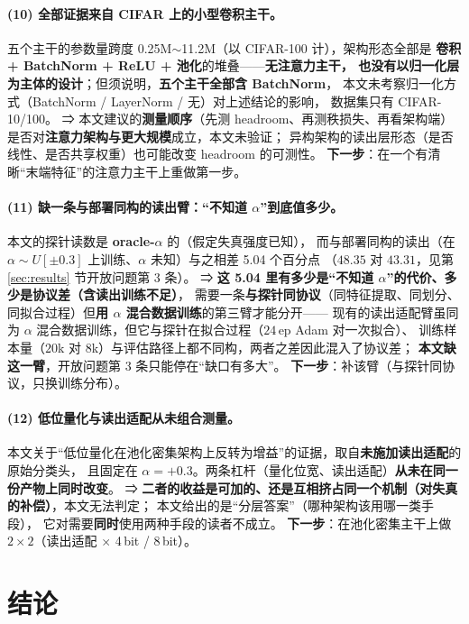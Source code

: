 \documentclass[11pt,a4paper]{ctexart}
\begin{document}
\paragraph{(10) 全部证据来自 CIFAR 上的小型卷积主干。}
五个主干的参数量跨度 0.25M$\sim$11.2M（以 CIFAR-100 计），架构形态全部是
\textbf{卷积 + BatchNorm + ReLU + 池化}的堆叠——\textbf{无注意力主干，
也没有以归一化层为主体的设计}；但须说明，\textbf{五个主干全部含 BatchNorm}，
本文未考察归一化方式（BatchNorm / LayerNorm / 无）对上述结论的影响，
数据集只有 CIFAR-10/100。
⇒ 本文建议的\textbf{测量顺序}（先测 headroom、再测秩损失、再看架构端）
是否对\textbf{注意力架构与更大规模}成立，本文未验证；
异构架构的读出层形态（是否线性、是否共享权重）也可能改变 headroom 的可测性。
\textbf{下一步}：在一个有清晰“末端特征”的注意力主干上重做第一步。

\paragraph{(11) 缺一条与部署同构的读出臂：“不知道 $\alpha$”到底值多少。}
本文的探针读数是 \textbf{oracle-$\alpha$} 的（假定失真强度已知），
而与部署同构的读出（在 $\alpha\sim U[\pm0.3]$ 上训练、$\alpha$ 未知）与之相差 5.04 个百分点
（$48.35$ 对 $43.31$，见第 \ref{sec:results} 节开放问题第 3 条）。
⇒ \textbf{这 5.04 里有多少是“不知道 $\alpha$”的代价、多少是协议差（含读出训练不足）}，
需要一条\textbf{与探针同协议}（同特征提取、同划分、同拟合过程）但\textbf{用 $\alpha$ 混合数据训练}的第三臂才能分开——
现有的读出适配臂虽同为 $\alpha$ 混合数据训练，但它与探针在拟合过程（$24$\,ep Adam 对一次拟合）、
训练样本量（$20$k 对 $8$k）与评估路径上都不同构，两者之差因此混入了协议差；
\textbf{本文缺这一臂}，开放问题第 3 条只能停在“缺口有多大”。
\textbf{下一步}：补该臂（与探针同协议，只换训练分布）。

\paragraph{(12) 低位量化与读出适配从未组合测量。}
本文关于“低位量化在池化密集架构上反转为增益”的证据，取自\textbf{未施加读出适配}的原始分类头，
且固定在 $\alpha=+0.3$。两条杠杆（量化位宽、读出适配）\textbf{从未在同一份产物上同时改变}。
⇒ \textbf{二者的收益是可加的、还是互相挤占同一个机制（对失真的补偿）}，本文无法判定；
本文给出的是“分层答案”（哪种架构该用哪一类手段），
它对需要\textbf{同时}使用两种手段的读者不成立。
\textbf{下一步}：在池化密集主干上做 $2\times2$（读出适配 $\times$ 4\,bit / 8\,bit）。

\section{结论}
\end{document}
